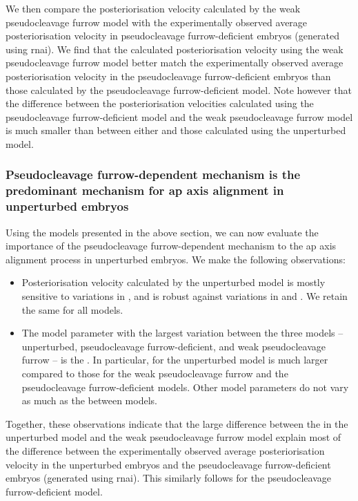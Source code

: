 We then compare the posteriorisation velocity calculated by the weak pseudocleavage furrow model with the experimentally observed average posteriorisation velocity in pseudocleavage furrow-deficient embryos (generated using  \ac{rnai}). We find that the calculated posteriorisation velocity using the weak pseudocleavage furrow model better match the experimentally observed average posteriorisation velocity in the pseudocleavage furrow-deficient embryos than those calculated by the pseudocleavage furrow-deficient model. Note however that the difference between the posteriorisation velocities calculated using the pseudocleavage furrow-deficient model and the weak pseudocleavage furrow model is much smaller than between either and those calculated using the unperturbed model.

\subsubsection{Pseudocleavage furrow-dependent mechanism is the predominant mechanism for \acs{ap} axis alignment in unperturbed embryos}\label{subsubsec:pcFurrowDominatesConclude}
Using the models presented in the above section, we can now evaluate the importance of the pseudocleavage furrow-dependent mechanism to the \ac{ap} axis alignment process in unperturbed embryos. We make the following observations:
\begin{itemize}
    \item Posteriorisation velocity calculated by the unperturbed model is mostly sensitive to variations in \nematicLength, and is robust against variations in \hydrodynamicLength and \activeRelaxLength. We retain the same \dragCoefficient for all models.
    \item The model parameter with the largest variation between the three models -- unperturbed, pseudocleavage furrow-deficient, and weak pseudocleavage furrow -- is the \nematicLength. In particular, \nematicLength for the unperturbed model is much larger compared to those for the weak pseudocleavage furrow and the pseudocleavage furrow-deficient models. Other model parameters do not vary as much as the \nematicLength between models.
\end{itemize}
Together, these observations indicate that the large difference between the \nematicLength in the unperturbed model and the weak pseudocleavage furrow model explain most of the difference between the experimentally observed average posteriorisation velocity in the unperturbed embryos and the pseudocleavage furrow-deficient embryos (generated using  \ac{rnai}). This similarly follows for the pseudocleavage furrow-deficient model. 


